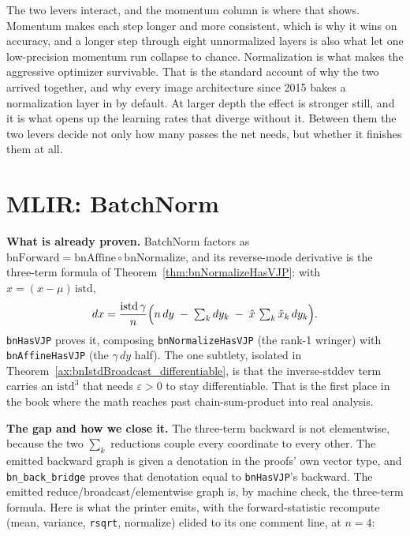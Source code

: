 The two levers interact, and the momentum column is where that shows.
Momentum makes each step longer and more consistent, which is why it wins
on accuracy, and a longer step through eight unnormalized layers is also
what let one low-precision momentum run collapse to chance. Normalization
is what makes the aggressive optimizer survivable. That is the standard
account of why the two arrived together, and why every image architecture
since 2015 bakes a normalization layer in by default. At larger depth
the effect is stronger still, and it is what opens up the learning rates
that diverge without it. Between them the two levers decide not only how
many passes the net needs, but whether it finishes them at all.

\section{MLIR: BatchNorm}

\noindent\textbf{What is already proven.} BatchNorm factors as
$\mathrm{bnForward} = \mathrm{bnAffine} \circ \mathrm{bnNormalize}$, and its
reverse-mode derivative is the three-term formula of
Theorem~\ref{thm:bnNormalizeHasVJP}: with $\hat{x} = (x-\mu)\,\mathrm{istd}$,
\[
  dx = \frac{\mathrm{istd}\,\gamma}{n}\Bigl(n\,dy
       \;-\; \textstyle\sum_k dy_k
       \;-\; \hat{x}\,\textstyle\sum_k \hat{x}_k\,dy_k\Bigr).
\]
\texttt{bnHasVJP} proves it, composing \texttt{bnNormalizeHasVJP}
(the rank-1 wringer) with \texttt{bnAffineHasVJP} (the $\gamma\,dy$
half). The one subtlety, isolated in Theorem~\ref{ax:bnIstdBroadcast_differentiable}, is
that the inverse-stddev term carries an $\mathrm{istd}^3$ that needs
$\varepsilon > 0$ to stay differentiable. That is the first place in the
book where the math reaches past chain-sum-product into real analysis.

\medskip\noindent\textbf{The gap and how we close it.} The three-term
backward is not elementwise, because the two $\sum_k$ reductions couple
every coordinate to every other. The emitted backward graph is given a
denotation in the proofs' own vector type, and
\texttt{bn\_back\_bridge} proves that denotation equal to
\texttt{bnHasVJP}'s backward. The emitted reduce/broadcast/elementwise
graph is, by machine check, the three-term formula. Here is what the
printer emits, with the forward-statistic recompute (mean, variance,
\texttt{rsqrt}, normalize) elided to its one comment line, at $n=4$:

